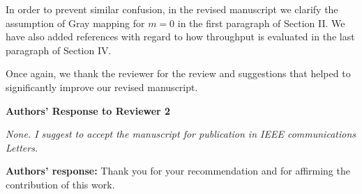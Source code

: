 \documentclass[onecolumn, 11pt, draftclsnofoot]{IEEEtran}
\begin{document}
In order to prevent similar confusion, in the revised manuscript we clarify the
assumption of Gray mapping for $m=0$ in the first paragraph of Section II. We
have also added references with regard to how throughput is evaluated in the
last paragraph of Section IV.
\vspace{0.5cm}


Once again, we thank the reviewer for the review and suggestions that helped to
significantly improve our revised manuscript. 

\newpage
\begin{center}
{\LARGE \textbf{Authors' Response to Reviewer 2}}
\end{center}

\noindent
\emph{None. I suggest to accept the manuscript for publication in IEEE
communications Letters.}

\noindent \textbf{Authors' response:}
Thank you for your recommendation and for affirming the contribution of this work. 

\vspace{0.5cm}

\newpage
\appendices
\end{document}
